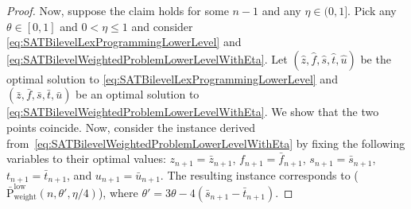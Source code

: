 \documentclass[runningheads,orivec]{llncs}
\newcommand{\MacroColor}[1]{#1}
\newcommand{\OneVector}{\mathbf{1}}
\newcommand{\NVariables}{\MacroColor{n}}
\newcommand{\SATBooleanFormula}{\MacroColor{F}}
\newcommand{\ReformZ}{\MacroColor{z}}
\newcommand{\ReformAugFrac}{\MacroColor{f}}
\newcommand{\ReformPen}{\MacroColor{e}}
\newcommand{\LexUVar}{\MacroColor{\theta}}
\newcommand{\LexLVarS}{\MacroColor{s}}
\newcommand{\LexLVarT}{\MacroColor{t}}
\newcommand{\LexLVarU}{\MacroColor{u}}
\newcommand{\LexLVarFuncU}{\MacroColor{f^u}}
\newcommand{\LexLVarFuncZ}{\MacroColor{f^z}}
\begin{document}
\begin{appendix}
\begin{proof}
Now, suppose the claim holds for some $\NVariables - 1$ and any $\eta \in (0, 1]$.
Pick any $\theta \in [0, 1]$ and $0 < \eta \le 1$ and consider \eqref{eq:SATBilevelLexProgrammingLowerLevel} and \eqref{eq:SATBilevelWeightedProblemLowerLevelWithEta}.
Let $(\hat{\ReformZ}, \hat{\ReformAugFrac}, \hat{\LexLVarS}, \hat{\LexLVarT}, \hat{\LexLVarU})$ be the optimal solution to \eqref{eq:SATBilevelLexProgrammingLowerLevel} and $(\bar{\ReformZ}, \bar{\ReformAugFrac}, \bar{\LexLVarS}, \bar{\LexLVarT}, \bar{\LexLVarU})$ be an optimal solution to \eqref{eq:SATBilevelWeightedProblemLowerLevelWithEta}.
We show that the two points coincide.
Now, consider the instance derived from~\eqref{eq:SATBilevelWeightedProblemLowerLevelWithEta} by fixing the following variables to their optimal values:
$\ReformZ_{\NVariables + 1} = \bar{\ReformZ}_{\NVariables + 1}$,  
$\ReformAugFrac_{\NVariables + 1} = \bar{\ReformAugFrac}_{\NVariables + 1}$,  
$\LexLVarS_{\NVariables + 1} = \bar{\LexLVarS}_{\NVariables + 1}$,  
$\LexLVarT_{\NVariables + 1} = \bar{\LexLVarT}_{\NVariables + 1}$, and  
$\LexLVarU_{\NVariables + 1} = \bar{\LexLVarU}_{\NVariables + 1}$.  
The resulting instance corresponds to (\hyperref[eq:SATBilevelWeightedProblemLowerLevelWithEta]{$\bar{\mathrm{P}}_{\text{weight}}^{\text{low}}(\NVariables, \LexUVar', \eta / 4)$}),  
where $\LexUVar' = 3\theta - 4(\bar{\LexLVarS}_{\NVariables + 1} - \bar{\LexLVarT}_{\NVariables + 1})$.  

\end{proof}
\end{appendix}
\end{document}
